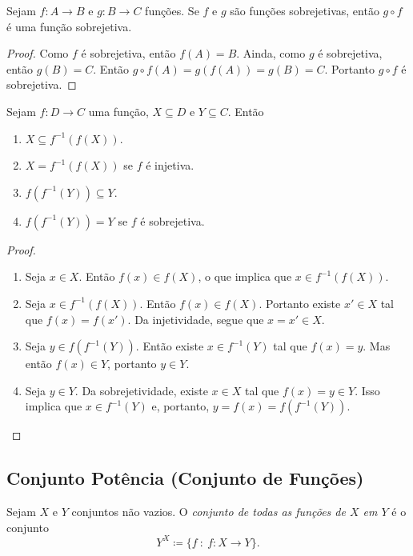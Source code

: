 \begin{prop}
\label{prop:comp.func.sobr}
	Sejam $f: A \to B$ e $g: B \to C$ funções. Se $f$ e $g$ são funções sobrejetivas, então $g \circ f$ é uma função sobrejetiva.
\end{prop}
\begin{proof}
	Como $f$ é sobrejetiva, então $f(A)=B$. Ainda, como $g$ é sobrejetiva, então $g(B)=C$. Então $g \circ f(A) = g(f(A))=g(B)=C$. Portanto $g \circ f$ é sobrejetiva.
\end{proof}

\begin{prop}
Sejam $f: D \to C$ uma função, $X \subseteq D$ e $Y \subseteq C$. Então
	\begin{enumerate}
	\item $X \subseteq f^{-1}(f(X))$.
	\item $X = f^{-1}(f(X))$ se $f$ é injetiva.
	\item $f(f^{-1}(Y)) \subseteq Y$.
	\item $f(f^{-1}(Y)) = Y$ se $f$ é sobrejetiva.
	\end{enumerate}
\end{prop}
\begin{proof}
	\begin{enumerate}
	\item Seja $x \in X$. Então $f(x) \in f(X)$, o que implica que $x \in f^{-1}(f(X))$.
	
	\item Seja $x \in f^{-1}(f(X))$. Então $f(x) \in f(X)$. Portanto existe $x' \in X$ tal que $f(x)=f(x')$. Da injetividade, segue que $x=x' \in X$.
	
	\item Seja $y \in f(f^{-1}(Y))$. Então existe $x \in f^{-1}(Y)$ tal que $f(x)=y$. Mas então $f(x) \in Y$, portanto $y \in Y$.
	
	\item Seja $y \in Y$. Da sobrejetividade, existe $x \in X$ tal que $f(x)=y \in Y$. Isso implica que $x \in f^{-1}(Y)$ e, portanto, $y=f(x)=f(f^{-1}(Y))$.
	\end{enumerate}
\end{proof}

\subsection{Conjunto Potência (Conjunto de Funções)}

\begin{defi}
	Sejam $X$ e $Y$ conjuntos não vazios. O \emph{conjunto de todas as funções de $X$ em $Y$} é o conjunto
	\begin{equation*}
	Y^X \coloneqq \{f\ :\ f: X \to Y\}.
	\end{equation*}
\end{defi}



